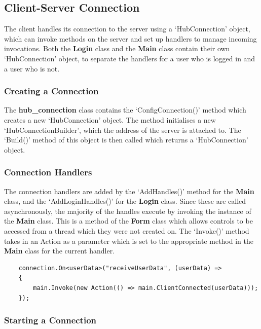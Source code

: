 \documentclass{article}
\begin{document}
\subsection{Client-Server Connection}

The client handles its connection to the server using a `HubConnection' object, which can invoke methods on the server and set up handlers to manage incoming invocations. Both the \textbf{Login} class and the \textbf{Main} class contain their own `HubConnection' object, to separate the handlers for a user who is logged in and a user who is not. \\

\subsubsection{Creating a Connection}

The \textbf{hub\_connection} class contains the `ConfigConnection()' method which creates a new `HubConnection' object. The method initialises a new `HubConnectionBuilder', which the address of the server is attached to. The `Build()' method of this object is then called which returns a `HubConnection' object.

\subsubsection{Connection Handlers}

The connection handlers are added by the `AddHandles()' method for the \textbf{Main} class, and the `AddLoginHandles()' for the \textbf{Login} class. Since these are called asynchronously, the majority of the handles execute by invoking the instance of the \textbf{Main} class. This is a method of the \textbf{Form} class which allows controls to be accessed from a thread which they were not created on. The `Invoke()' method takes in an Action as a parameter which is set to the appropriate method in the \textbf{Main} class for the current handler.

\begin{verbatim}
    connection.On<userData>("receiveUserData", (userData) =>
    {
        main.Invoke(new Action(() => main.ClientConnected(userData)));
    });
\end{verbatim}

\subsubsection{Starting a Connection}
\end{document}
